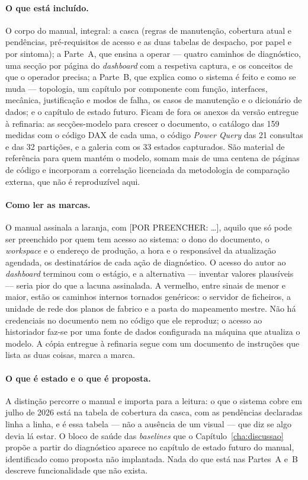 \paragraph{O que está incluído.} O corpo do manual, integral: a casca
(regras de manutenção, cobertura atual e pendências, pré-requisitos de acesso
e as duas tabelas de despacho, por papel e por sintoma); a Parte~A, que
ensina a operar --- quatro caminhos de diagnóstico, uma secção por página do
\emph{dashboard} com a respetiva captura, e os conceitos de que o operador
precisa; a Parte~B, que explica como o sistema é feito e como se muda ---
topologia, um capítulo por componente com função, interfaces, mecânica,
justificação e modos de falha, os casos de manutenção e o dicionário de dados;
e o capítulo de estado futuro. Ficam de fora os anexos da versão entregue à
refinaria: as secções-modelo para crescer o documento, o catálogo das
159 medidas com o código \gls{DAX} de cada uma, o código
\emph{Power Query} das 21 consultas e das 32 partições, e a
galeria com os 33 estados capturados. São material de referência para
quem mantém o modelo, somam mais de uma centena de páginas de código e
incorporam a correlação licenciada da metodologia de comparação externa, que
não é reproduzível aqui.

\paragraph{Como ler as marcas.} O manual assinala a laranja, com
\textsf{[POR PREENCHER: \ldots]}, aquilo que só pode ser preenchido por quem
tem acesso ao sistema: o dono do documento, o \emph{workspace} e o endereço de
produção, a hora e o responsável da atualização agendada, os destinatários de
cada ação de diagnóstico. O acesso do autor ao \emph{dashboard} terminou com o
estágio, e a alternativa --- inventar valores plausíveis --- seria pior do que
a lacuna assinalada. A vermelho, entre sinais de menor e maior, estão os
caminhos internos tornados genéricos: o servidor de ficheiros, a unidade de
rede dos planos de fabrico e a pasta do mapeamento mestre. Não há credenciais
no documento nem no código que ele reproduz; o acesso ao historiador faz-se
por uma fonte de dados configurada na máquina que atualiza o modelo. A cópia
entregue à refinaria segue com um documento de instruções que lista as duas
coisas, marca a marca.

\paragraph{O que é estado e o que é proposta.} A distinção percorre o manual e
importa para a leitura: o que o sistema cobre em julho de 2026 está na tabela
de cobertura da casca, com as pendências declaradas linha a linha, e é essa
tabela --- não a ausência de um visual --- que diz se algo devia lá estar. O
bloco de saúde das \emph{baselines} que o Capítulo~\ref{cha:discussao} propõe
a partir do diagnóstico aparece no capítulo de estado futuro do manual,
identificado como proposta não implantada. Nada do que está nas Partes~A e~B
descreve funcionalidade que não exista.

